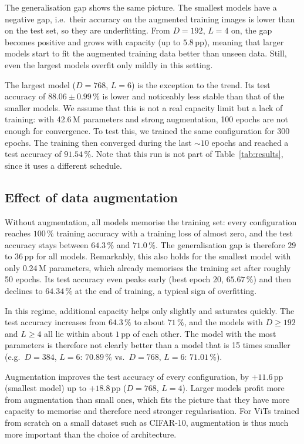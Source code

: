 The generalisation gap shows the same picture. The smallest models have a negative gap, i.e.\ their accuracy on the augmented training images is lower than on the test set, so they are underfitting. From $D=192$, $L=4$ on, the gap becomes positive and grows with capacity (up to $5.8$\,pp), meaning that larger models start to fit the augmented training data better than unseen data. Still, even the largest models overfit only mildly in this setting.

The largest model ($D=768$, $L=6$) is the exception to the trend. Its test accuracy of $88.06 \pm 0.99\,\%$ is lower and noticeably less stable than that of the smaller models. We assume that this is not a real capacity limit but a lack of training: with 42.6\,M parameters and strong augmentation, 100 epochs are not enough for convergence. To test this, we trained the same configuration for 300 epochs. The training then converged during the last ${\sim}10$ epochs and reached a test accuracy of $91.54\,\%$. Note that this run is not part of Table~\ref{tab:results}, since it uses a different schedule.

\subsection{Effect of data augmentation}

Without augmentation, all models memorise the training set: every configuration reaches $100\,\%$ training accuracy with a training loss of almost zero, and the test accuracy stays between $64.3\,\%$ and $71.0\,\%$. The generalisation gap is therefore $29$ to $36$\,pp for all models. Remarkably, this also holds for the smallest model with only 0.24\,M parameters, which already memorises the training set after roughly 50 epochs. Its test accuracy even peaks early (best epoch 20, $65.67\,\%$) and then declines to $64.34\,\%$ at the end of training, a typical sign of overfitting.

In this regime, additional capacity helps only slightly and saturates quickly. The test accuracy increases from $64.3\,\%$ to about $71\,\%$, and the models with $D\geq192$ and $L\geq4$ all lie within about $1$\,pp of each other. The model with the most parameters is therefore not clearly better than a model that is 15 times smaller (e.g.\ $D=384$, $L=6$: $70.89\,\%$ vs.\ $D=768$, $L=6$: $71.01\,\%$).

Augmentation improves the test accuracy of every configuration, by $+11.6$\,pp (smallest model) up to $+18.8$\,pp ($D=768$, $L=4$). Larger models profit more from augmentation than small ones, which fits the picture that they have more capacity to memorise and therefore need stronger regularisation. For ViTs trained from scratch on a small dataset such as CIFAR-10, augmentation is thus much more important than the choice of architecture.

